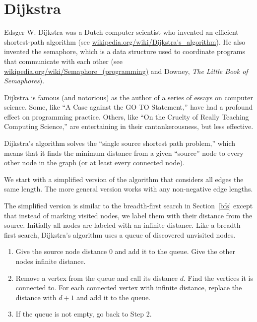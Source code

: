 \documentclass[10pt]{book}
\begin{document}
\section{Dijkstra}

Edsger W. Dijkstra was a Dutch computer scientist who invented an
efficient shortest-path algorithm (see
\url{wikipedia.org/wiki/Dijkstra's_algorithm}).  He also invented the
semaphore, which is a data structure used to coordinate programs that
communicate with each other (see
\url{wikipedia.org/wiki/Semaphore_(programming)} and Downey, {\em The
  Little Book of Semaphores}).

Dijkstra is famous (and notorious) as the author of a series
of essays on computer science.
Some, like ``A Case against the GO TO Statement,'' have
had a profound effect on programming practice.
Others, like
``On the Cruelty of Really Teaching Computing Science,'' are
entertaining in their cantankerousness, but less effective.

Dijkstra's algorithm solves the ``single source shortest path problem,''
which means that it finds the minimum distance from a given ``source''
node to every other node in the graph (or at least every connected
node).

We start with a simplified version of the algorithm that
considers all edges the same length.  The more general version
works with any non-negative edge lengths.

The simplified version is similar to the breadth-first search
in Section~\ref{bfs} except that instead of marking visited nodes,
we label them with their distance from the source.  Initially
all nodes are labeled with an infinite distance.  Like a
breadth-first search, Dijkstra's algorithm uses a queue of
discovered unvisited nodes.

\begin{enumerate}

\item Give the source node distance 0 and add it to the queue.
Give the other nodes infinite distance.

\item Remove a vertex from the queue and call its distance $d$.  Find
  the vertices it is connected to.  For each connected vertex
  with infinite distance, replace the distance with $d+1$ and
  add it to the queue.

\item If the queue is not empty, go back to Step 2.

\end{enumerate}
\end{document}
